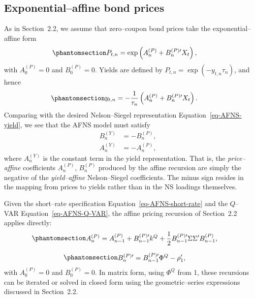 \documentclass[
  letterpaper,
  DIV=11,
  numbers=noendperiod]{scrreprt}
\begin{document}
\subsection*{Exponential--affine bond
prices}\label{exponentialaffine-bond-prices}

As in Section~2.2, we assume that zero--coupon bond prices take the
exponential--affine form
\begin{equation}\protect\phantomsection\label{eq-AFNS-price}{
\begin{align}
P_{t,n}
&= \exp \left( A_n^{(P)} + B_n^{(P)\prime} X_t \right),
\end{align}
}\end{equation} with \(A_0^{(P)} = 0\) and \(B_0^{(P)} = 0\). Yields are
defined by \(P_{t,n} = \exp(- y_{t,n} \tau_n)\), and hence
\begin{equation}\protect\phantomsection\label{eq-AFNS-yield-from-price}{
\begin{align}
y_{t,n}
&= -\frac{1}{\tau_n} \left( A_n^{(P)} + B_n^{(P)\prime} X_t \right).
\end{align}
}\end{equation} Comparing with the desired Nelson--Siegel representation
Equation~\ref{eq-AFNS-yield}, we see that the AFNS model must satisfy
\begin{align}
B_n^{(Y)} &= - B_n^{(P)}, \\
A_n^{(Y)} &= - A_n^{(P)},
\end{align}
where \(A_n^{(Y)}\) is the constant term in the yield representation.
That is, the \emph{price--affine} coefficients \(A_n^{(P)}\),
\(B_n^{(P)}\) produced by the affine recursion are simply the negative
of the \emph{yield--affine} Nelson--Siegel coefficients. The minus sign
resides in the mapping from prices to yields rather than in the NS
loadings themselves.

Given the short--rate specification Equation~\ref{eq-AFNS-short-rate}
and the \(Q\)--VAR Equation~\ref{eq-AFNS-Q-VAR}, the affine pricing
recursion of Section~2.2 applies directly:
\begin{equation}\protect\phantomsection\label{eq-AFNS-A-recursion}{
\begin{align}
A_n^{(P)}
&= A_{n-1}^{(P)} + B_{n-1}^{(P)\prime} k^Q
    + \frac{1}{2} B_{n-1}^{(P)\prime} \Sigma \Sigma^\prime B_{n-1}^{(P)},
\end{align}
}\end{equation}

\begin{equation}\protect\phantomsection\label{eq-AFNS-B-recursion}{
\begin{align}
B_n^{(P)\prime}
&= B_{n-1}^{(P)\prime} \Phi^Q - \rho_1^\prime,
\end{align}
}\end{equation} with \(A_0^{(P)} = 0\) and \(B_0^{(P)} = 0\). In matrix
form, using \(\Phi^Q\) from 1, these recursions can be iterated or
solved in closed form using the geometric--series expressions discussed
in Section~2.2.
\end{document}
